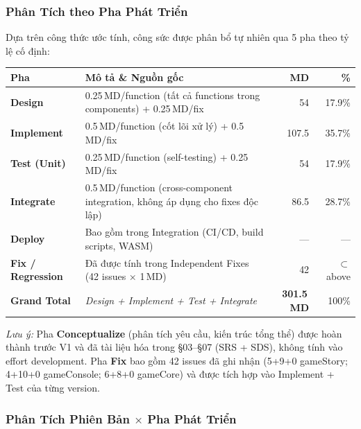 \documentclass[12pt,a4paper]{article}
\begin{document}
\subsubsection{Phân Tích theo Pha Phát Triển}

Dựa trên công thức ước tính, công sức được phân bổ tự nhiên qua 5 pha theo tỷ lệ cố định:

\begin{center}
\renewcommand{\arraystretch}{1.35}
\begin{tabularx}{0.96\linewidth}{|l|X|r|r|}
\hline
\rowcolor{headerGray!30}
\textbf{Pha} & \textbf{Mô tả \& Nguồn gốc} & \textbf{MD} & \textbf{\%} \\
\hline
\rowcolor{rowLight}
\textbf{Design} & 0.25\,MD/function (tất cả functions trong components) + 0.25\,MD/fix & 54 & 17.9\% \\
\textbf{Implement} & 0.5\,MD/function (cốt lõi xử lý) + 0.5\,MD/fix & 107.5 & 35.7\% \\
\rowcolor{rowLight}
\textbf{Test (Unit)} & 0.25\,MD/function (self-testing) + 0.25\,MD/fix & 54 & 17.9\% \\
\textbf{Integrate} & 0.5\,MD/function (cross-component integration, không áp dụng cho fixes độc lập) & 86.5 & 28.7\% \\
\rowcolor{rowLight}
\textbf{Deploy} & Bao gồm trong Integration (CI/CD, build scripts, WASM)
& — & — \\
\textbf{Fix / Regression} & Đã được tính trong Independent Fixes (42 issues × 1\,MD) & 42 & $\subset$ above \\
\hline
\rowcolor{headerGray!20}
\textbf{Grand Total} & \textit{Design + Implement + Test + Integrate} & \textbf{301.5\,MD} & 100\% \\
\hline
\end{tabularx}
\end{center}

\noindent\textit{Lưu ý:} Pha \textbf{Conceptualize} (phân tích yêu cầu, kiến trúc tổng thể) được hoàn thành trước V1 và đã tài liệu hóa trong §03--§07 (SRS + SDS), không tính vào effort development.
Pha \textbf{Fix} bao gồm 42 issues đã ghi nhận (5+9+0 gameStory; 4+10+0 gameConsole; 6+8+0 gameCore) và được tích hợp vào Implement + Test của từng version.
\subsubsection{Phân Tích Phiên Bản \texorpdfstring{$\times$}{x} Pha Phát Triển}
\end{document}
